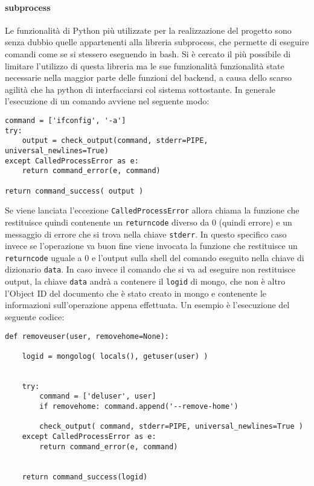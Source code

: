 \documentclass[11pt]{article}
\begin{document}
\paragraph{subprocess}
Le funzionalità di Python più utilizzate per la realizzazione del progetto sono senza dubbio quelle appartenenti alla libreria subprocess,
che permette di eseguire comandi come se si stessero eseguendo in bash. Si è cercato il più possibile di limitare l'utilizzo di questa libreria
ma le sue funzionalità funzionalità state necessarie nella maggior parte delle funzioni del backend, a causa dello scarso agilità che ha python
di interfacciarsi col sistema sottostante.
In generale l'esecuzione di un comando avviene nel seguente modo:
\begin{lstlisting}
command = ['ifconfig', '-a']
try:
	output = check_output(command, stderr=PIPE, universal_newlines=True)
except CalledProcessError as e:
	return command_error(e, command)

return command_success( output )
\end{lstlisting}
Se viene lanciata l'eccezione \texttt{CalledProcessError} allora chiama la funzione  che restituisce quindi
contenente un \texttt{returncode} diverso da 0 (quindi errore) e un messaggio di errore che si trova nella chiave \texttt{stderr}.
In questo specifico caso invece se l'operazione va buon fine viene invocata la funzione  che restituisce
un \texttt{returncode} uguale a 0 e l'output sulla shell del comando eseguito nella chiave di dizionario \texttt{data}.
In caso invece il comando che si va ad eseguire non restituisce output, la chiave \texttt{data} andrà a contenere il \texttt{logid}
di mongo, che non è altro l'Object ID del documento che è stato creato in mongo e contenente le informazioni sull'operazione appena effettuata.
Un esempio è l'esecuzione del seguente codice:
\begin{lstlisting}
def removeuser(user, removehome=None):
        
    logid = mongolog( locals(), getuser(user) )
    

    try:
        command = ['deluser', user]
        if removehome: command.append('--remove-home') 

        check_output( command, stderr=PIPE, universal_newlines=True )
    except CalledProcessError as e:
        return command_error(e, command)
    
    
    return command_success(logid)
\end{lstlisting}
\end{document}
